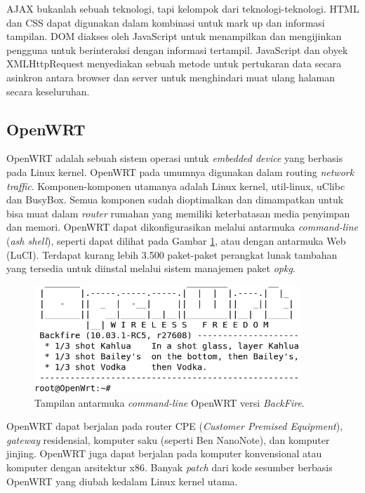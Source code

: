 \documentclass{jtetiproposalskripsi}
\begin{document}
AJAX bukanlah sebuah teknologi, tapi kelompok dari teknologi-teknologi. HTML dan CSS dapat digunakan dalam kombinasi untuk mark up dan informasi tampilan. DOM diakses oleh JavaScript untuk menampilkan dan mengijinkan pengguna untuk berinteraksi dengan informasi tertampil. JavaScript dan obyek XMLHttpRequest menyediakan sebuah metode untuk pertukaran data secara asinkron antara browser dan server untuk menghindari muat ulang halaman secara keseluruhan.


\subsection{OpenWRT}
OpenWRT adalah sebuah sistem operasi untuk \emph{embedded device} yang berbasis pada Linux kernel. OpenWRT pada umumnya digunakan dalam routing \emph{network traffic}. Komponen-komponen utamanya adalah Linux kernel, util-linux, uClibc dan BusyBox. Semua komponen sudah dioptimalkan dan dimampatkan untuk bisa muat dalam \emph{router} rumahan yang memiliki keterbatasan media penyimpan dan memori. OpenWRT dapat dikonfigurasikan melalui antarmuka \emph{command-line} (\emph{ash shell}), seperti dapat dilihat pada Gambar \ref{openwrt}, atau dengan antarmuka Web (LuCI). Terdapat kurang lebih 3.500 paket-paket perangkat lunak tambahan yang tersedia untuk diinstal melalui sistem manajemen paket \emph{opkg}.

\begin{figure}[ht!]
  \centering
    \includegraphics[width=10cm]{gambar/openwrt}
    \caption{Tampilan antarmuka \emph{command-line} OpenWRT versi \emph{BackFire}.}
    \label{openwrt}
\end{figure}

OpenWRT dapat berjalan pada router CPE (\emph{Customer Premised Equipment}), \emph{gateway} residensial, komputer saku (seperti Ben NanoNote), dan komputer jinjing. OpenWRT juga dapat berjalan pada komputer konvensional atau komputer dengan arsitektur x86. Banyak \emph{patch} dari kode sesumber berbasis OpenWRT yang diubah kedalam Linux kernel utama.

\end{document}
